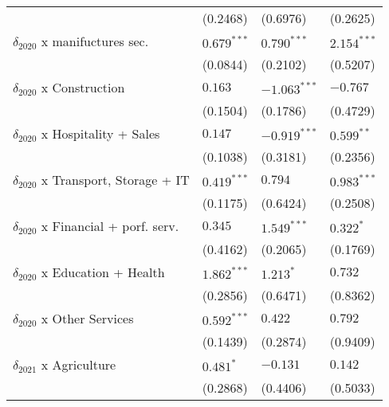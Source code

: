 \begin{tabular}{llll}
                                                   &           (0.2468) &           (0.6976) &           (0.2625) \\
$\delta_{2020}$ x manifuctures sec.                &      $0.679^{***}$ &      $0.790^{***}$ &      $2.154^{***}$ \\
                                                   &           (0.0844) &           (0.2102) &           (0.5207) \\
$\delta_{2020}$ x Construction                     &            $0.163$ &     $-1.063^{***}$ &           $-0.767$ \\
                                                   &           (0.1504) &           (0.1786) &           (0.4729) \\
$\delta_{2020}$ x Hospitality + Sales              &            $0.147$ &     $-0.919^{***}$ &       $0.599^{**}$ \\
                                                   &           (0.1038) &           (0.3181) &           (0.2356) \\
$\delta_{2020}$ x Transport, Storage + IT          &      $0.419^{***}$ &            $0.794$ &      $0.983^{***}$ \\
                                                   &           (0.1175) &           (0.6424) &           (0.2508) \\
$\delta_{2020}$ x Financial + porf. serv.          &            $0.345$ &      $1.549^{***}$ &          $0.322^*$ \\
                                                   &           (0.4162) &           (0.2065) &           (0.1769) \\
$\delta_{2020}$ x Education + Health               &      $1.862^{***}$ &          $1.213^*$ &            $0.732$ \\
                                                   &           (0.2856) &           (0.6471) &           (0.8362) \\
$\delta_{2020}$ x Other Services                   &      $0.592^{***}$ &            $0.422$ &            $0.792$ \\
                                                   &           (0.1439) &           (0.2874) &           (0.9409) \\
$\delta_{2021}$ x Agriculture                      &          $0.481^*$ &           $-0.131$ &            $0.142$ \\
                                                   &           (0.2868) &           (0.4406) &           (0.5033) \\

\end{tabular}
